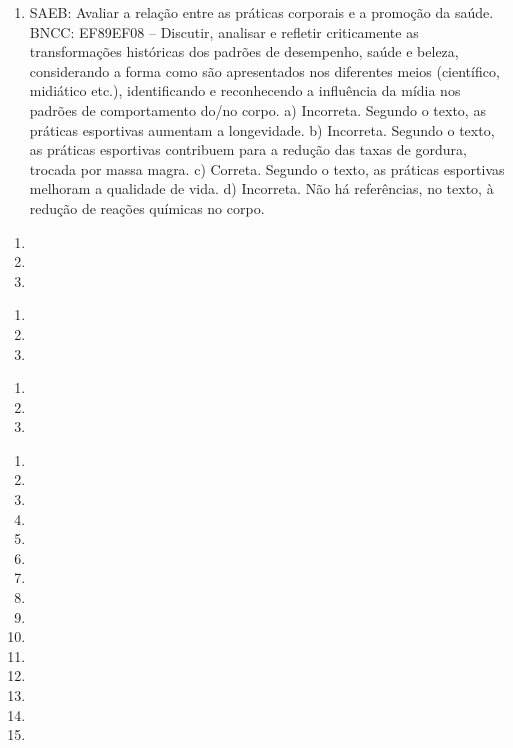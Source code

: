 \begin{enumerate}
\item
SAEB: Avaliar a relação entre as práticas corporais e a promoção da
saúde.
BNCC: EF89EF08 -- Discutir, analisar e refletir criticamente as
transformações históricas dos padrões de desempenho, saúde e beleza,
considerando a forma como são apresentados nos diferentes meios
(científico, midiático etc.), identificando e reconhecendo a influência
da mídia nos padrões de comportamento do/no corpo.
a) Incorreta. Segundo o texto, as práticas esportivas aumentam a
longevidade.
b) Incorreta. Segundo o texto, as práticas esportivas contribuem para a 
redução das taxas de gordura, trocada por massa magra.
c) Correta. Segundo o texto, as práticas esportivas melhoram a 
qualidade de vida.  
d) Incorreta. Não há referências, no texto, à redução de reações químicas
no corpo.
\end{enumerate}


\begin{enumerate}
\item

\item

\item
\end{enumerate}


\begin{enumerate}
\item

\item

\item
\end{enumerate}


\begin{enumerate}
\item

\item

\item
\end{enumerate}


\begin{enumerate}
\item
\item
\item
\item
\item
\item
\item
\item
\item
\item
\item
\item
\item
\item
\item
\end{enumerate}

